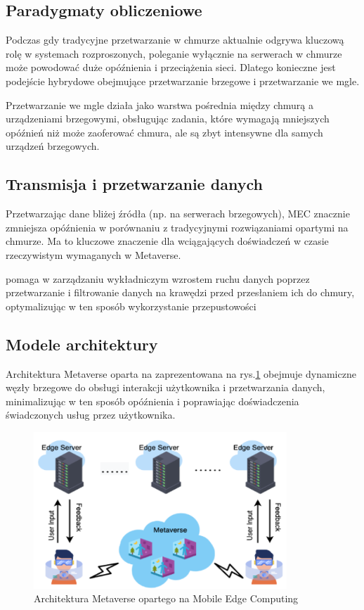 \subsection{Paradygmaty obliczeniowe}

Podczas gdy tradycyjne przetwarzanie w chmurze aktualnie odgrywa kluczową rolę w systemach rozproszonych, poleganie wyłącznie na serwerach w chmurze może powodować duże opóźnienia i przeciążenia sieci. Dlatego konieczne jest podejście hybrydowe obejmujące przetwarzanie brzegowe i przetwarzanie we mgle.

Przetwarzanie we mgle działa jako warstwa pośrednia między chmurą a urządzeniami brzegowymi, obsługując zadania, które wymagają mniejszych opóźnień niż może zaoferować chmura, ale są zbyt intensywne dla samych urządzeń brzegowych.

\subsection{Transmisja i przetwarzanie danych}

Przetwarzając dane bliżej źródła (np. na serwerach brzegowych), MEC znacznie zmniejsza opóźnienia w porównaniu z tradycyjnymi rozwiązaniami opartymi na chmurze. Ma to kluczowe znaczenie dla wciągających doświadczeń w czasie rzeczywistym wymaganych w Metaverse.

 pomaga w zarządzaniu wykładniczym wzrostem ruchu danych poprzez przetwarzanie i filtrowanie danych na krawędzi przed przesłaniem ich do chmury, optymalizując w ten sposób wykorzystanie przepustowości

\subsection{Modele architektury}

Architektura Metaverse oparta na  zaprezentowana na rys.\ref{mecBaseArch} obejmuje dynamiczne węzły brzegowe do obsługi interakcji użytkownika i przetwarzania danych, minimalizując w ten sposób opóźnienia i poprawiając doświadczenia świadczonych usług przez użytkownika.

\begin{figure}[htbp!]
    \centering
    \includegraphics[width=0.85\textwidth]{images/existingArchitectres/mecBaseArch.png}
    \caption{Architektura Metaverse opartego na Mobile Edge Computing}
    \label{mecBaseArch}
\end{figure}

